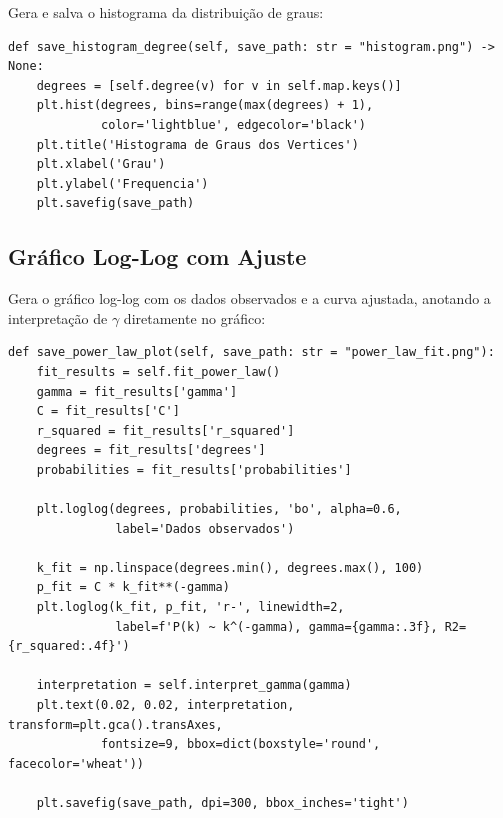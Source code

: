 \documentclass[12pt,a4paper]{article}
\begin{document}
Gera e salva o histograma da distribuição de graus:

\begin{lstlisting}
def save_histogram_degree(self, save_path: str = "histogram.png") -> None:
    degrees = [self.degree(v) for v in self.map.keys()]
    plt.hist(degrees, bins=range(max(degrees) + 1),
             color='lightblue', edgecolor='black')
    plt.title('Histograma de Graus dos Vertices')
    plt.xlabel('Grau')
    plt.ylabel('Frequencia')
    plt.savefig(save_path)
\end{lstlisting}

\subsection{Gráfico Log-Log com Ajuste}

Gera o gráfico log-log com os dados observados e a curva ajustada, anotando a interpretação de $\gamma$ diretamente no gráfico:

\begin{lstlisting}
def save_power_law_plot(self, save_path: str = "power_law_fit.png"):
    fit_results = self.fit_power_law()
    gamma = fit_results['gamma']
    C = fit_results['C']
    r_squared = fit_results['r_squared']
    degrees = fit_results['degrees']
    probabilities = fit_results['probabilities']

    plt.loglog(degrees, probabilities, 'bo', alpha=0.6,
               label='Dados observados')

    k_fit = np.linspace(degrees.min(), degrees.max(), 100)
    p_fit = C * k_fit**(-gamma)
    plt.loglog(k_fit, p_fit, 'r-', linewidth=2,
               label=f'P(k) ~ k^(-gamma), gamma={gamma:.3f}, R2={r_squared:.4f}')

    interpretation = self.interpret_gamma(gamma)
    plt.text(0.02, 0.02, interpretation, transform=plt.gca().transAxes,
             fontsize=9, bbox=dict(boxstyle='round', facecolor='wheat'))

    plt.savefig(save_path, dpi=300, bbox_inches='tight')
\end{lstlisting}
\end{document}
